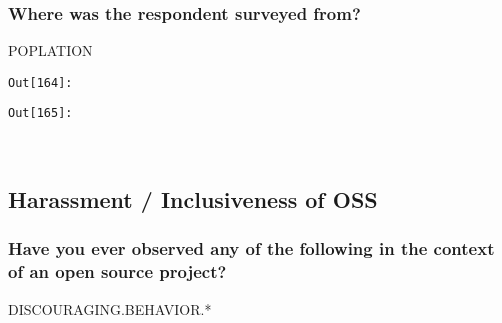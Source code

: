\documentclass[11pt]{article}
\begin{document}
    \subsubsection{Where was the respondent surveyed
from?}\label{where-was-the-respondent-surveyed-from}

POPLATION

\texttt{\color{outcolor}Out[{\color{outcolor}164}]:}
    

    

\texttt{\color{outcolor}Out[{\color{outcolor}165}]:}
    

    


    \begin{center}
    \end{center}
    { \hspace*{\fill} \\}
    
    \subsection{Harassment / Inclusiveness of
OSS}\label{harassment-inclusiveness-of-oss}

    \subsubsection{Have you ever observed any of the following in the
context of an open source
project?}\label{have-you-ever-observed-any-of-the-following-in-the-context-of-an-open-source-project}

DISCOURAGING.BEHAVIOR.*
\end{document}
